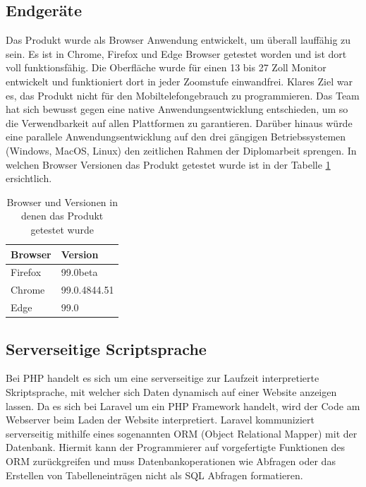 \subsection{Endgeräte}
Das Produkt wurde als Browser Anwendung entwickelt, um überall lauffähig zu sein. Es ist in Chrome, Firefox und Edge Browser getestet worden und ist dort voll funktionsfähig. Die Oberfläche wurde für einen 13 bis 27 Zoll Monitor entwickelt und funktioniert dort in jeder Zoomstufe einwandfrei. Klares Ziel war es, das Produkt nicht für den Mobiltelefongebrauch zu programmieren. Das Team hat sich bewusst gegen eine native Anwendungsentwicklung entschieden, um so die Verwendbarkeit auf allen Plattformen zu garantieren. Darüber hinaus würde eine parallele Anwendungsentwicklung auf den drei gängigen Betriebssystemen (Windows, MacOS, Linux) den zeitlichen Rahmen der Diplomarbeit sprengen. In welchen Browser Versionen das Produkt getestet wurde ist in der Tabelle \ref{tab:Browser und Versionen in denen das Produkt getestet wurde} ersichtlich. 

\newpage
\begin{table}[h]

	\begin{tabular}{|l|l|}
		\hline
		Browser & Version      \\ \hline
		Firefox & 99.0beta     \\ \hline
		Chrome  & 99.0.4844.51 \\ \hline
		Edge    & 99.0         \\ \hline
	\end{tabular}
\caption{Browser und Versionen in denen das Produkt getestet wurde}
\label{tab:Browser und Versionen in denen das Produkt getestet wurde}
\end{table}


\subsection{Serverseitige Scriptsprache }
Bei PHP handelt es sich um eine serverseitige zur Laufzeit interpretierte Skriptsprache, mit welcher sich Daten dynamisch auf einer Website anzeigen lassen. Da es sich bei Laravel um ein PHP Framework handelt, wird der Code am Webserver beim Laden der Website interpretiert. Laravel kommuniziert serverseitig mithilfe eines sogenannten ORM (Object Relational Mapper) mit der Datenbank. Hiermit kann der Programmierer auf vorgefertigte Funktionen des ORM zurückgreifen und muss Datenbankoperationen wie Abfragen oder das Erstellen von Tabelleneinträgen nicht als SQL Abfragen formatieren.

